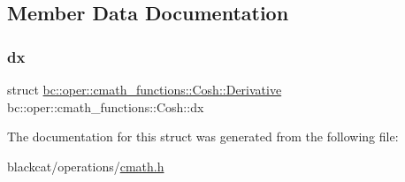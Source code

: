 \subsection{Member Data Documentation}
\mbox{\label{structbc_1_1oper_1_1cmath__functions_1_1Cosh_aaed626a7155e6df3c7ea226793f8b0e7}} 
\subsubsection{\texorpdfstring{dx}{dx}}
{\footnotesize\ttfamily struct \hyperlink{structbc_1_1oper_1_1cmath__functions_1_1Cosh_1_1Derivative}{bc\+::oper\+::cmath\+\_\+functions\+::\+Cosh\+::\+Derivative}   bc\+::oper\+::cmath\+\_\+functions\+::\+Cosh\+::dx}



The documentation for this struct was generated from the following file\+:\begin{DoxyCompactItemize}
\item 
blackcat/operations/\hyperlink{cmath_8h}{cmath.\+h}\end{DoxyCompactItemize}
